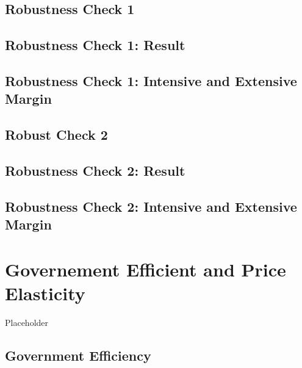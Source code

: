 \documentclass[ review  , 3p ]{elsarticle}
\begin{document}
  \hypertarget{robustness-check-1}{%
  \subsection{Robustness Check 1}\label{robustness-check-1}}
  
  \hypertarget{robustness-check-1-result}{%
  \subsection{Robustness Check 1: Result}\label{robustness-check-1-result}}
  
  \hypertarget{robustness-check-1-intensive-and-extensive-margin}{%
  \subsection{Robustness Check 1: Intensive and Extensive Margin}\label{robustness-check-1-intensive-and-extensive-margin}}
  
  \hypertarget{robust-check-2}{%
  \subsection{Robust Check 2}\label{robust-check-2}}
  
  \hypertarget{robustness-check-2-result}{%
  \subsection{Robustness Check 2: Result}\label{robustness-check-2-result}}
  
  \hypertarget{robustness-check-2-intensive-and-extensive-margin}{%
  \subsection{Robustness Check 2: Intensive and Extensive Margin}\label{robustness-check-2-intensive-and-extensive-margin}}
  
  \hypertarget{governement-efficient-and-price-elasticity}{%
  \section{Governement Efficient and Price Elasticity}\label{governement-efficient-and-price-elasticity}}
  
  Placeholder
  
  \hypertarget{government-efficiency}{%
  \subsection{Government Efficiency}\label{government-efficiency}}
  
\end{document}
